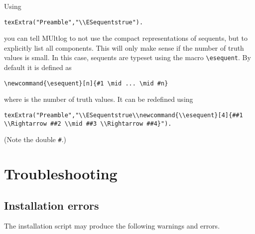 \documentclass[]{article}
\begin{document}
Using

\begin{verbatim}
texExtra("Preamble","\\ESequentstrue").
\end{verbatim}

you can tell MUltlog to not use the compact representations of sequents,
but to explicitly list all components. This will only make sense if the
number of truth values is small. In this case, sequents are typeset
using the macro \texttt{\textbackslash{}esequent}. By default it is
defined as

\begin{verbatim}
\newcommand{\esequent}[n]{#1 \mid ... \mid #n}
\end{verbatim}

where is the number of truth values. It can be redefined using

\begin{verbatim}
texExtra("Preamble","\\ESequentstrue\\newcommand{\\esequent}[4]{##1 \\Rightarrow ##2 \\mid ##3 \\Rightarrow ##4}").
\end{verbatim}

(Note the double \texttt{\#}.)

\hypertarget{troubleshooting}{%
\section{Troubleshooting}\label{troubleshooting}}

\hypertarget{installation-errors}{%
\subsection{Installation errors}\label{installation-errors}}

The installation script may produce the following warnings and errors.
\end{document}
